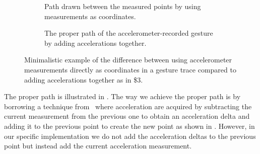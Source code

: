 \begin{figure}[h]
    \begin{subfigure}{.5\linewidth}
    \caption{Path drawn between the measured points by using measurements as coordinates.}
\label{fig:accelerometerpath}
    \end{subfigure}
    \begin{subfigure}{.5\linewidth}
    \caption{The proper path of the accelerometer-recorded gesture by adding accelerations together.}
\label{fig:acceleromterpath-proper}
    \end{subfigure}
\caption{Minimalistic example of the difference between using accelerometer measurements directly as coordinates in a gesture trace compared to adding accelerations together as in \$3.}
\end{figure}

The proper path is illustrated in .
The way we achieve the proper path is by borrowing a technique from~\cite{threedollar} where acceleration are acquired by subtracting the current measurement from the previous one to obtain an acceleration delta and adding it to the previous point to create the new point as shown in .
However, in our specific implementation we do not add the acceleration deltas to the previous point but instead add the current acceleration measurement.

